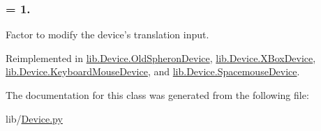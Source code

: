 \hypertarget{classlib_1_1Device_1_1MultiDofDevice_a92b1c30e0edb14afd629c053d6719594}{
\subsubsection[{translation\-\_\-factor}]{ = 1.}}\label{classlib_1_1Device_1_1MultiDofDevice_a92b1c30e0edb14afd629c053d6719594}


\-Factor to modify the device's translation input. 



\-Reimplemented in \hyperlink{classlib_1_1Device_1_1OldSpheronDevice_a9cfb9fb037b8aaa46875766b80cdc6a6}{lib.\-Device.\-Old\-Spheron\-Device}, \hyperlink{classlib_1_1Device_1_1XBoxDevice_a3f49c1e0a121515d887ab15e258ca0c8}{lib.\-Device.\-X\-Box\-Device}, \hyperlink{classlib_1_1Device_1_1KeyboardMouseDevice_aaf8a0ccdb6ab57e3e7b6710b137af971}{lib.\-Device.\-Keyboard\-Mouse\-Device}, and \hyperlink{classlib_1_1Device_1_1SpacemouseDevice_a5626eab9cd79cdae239f50012fbfca59}{lib.\-Device.\-Spacemouse\-Device}.



\-The documentation for this class was generated from the following file\-:\begin{DoxyCompactItemize}
\item 
lib/\hyperlink{Device_8py}{\-Device.\-py}\end{DoxyCompactItemize}
